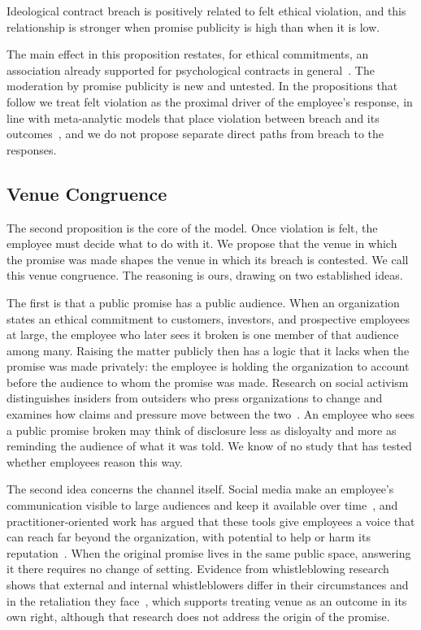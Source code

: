 \begin{proposition}
Ideological contract breach is positively related to felt ethical violation, and this relationship is stronger when promise publicity is high than when it is low.
\end{proposition}

The main effect in this proposition restates, for ethical commitments, an association already supported for psychological contracts in general~\citep{zhao2007impact}. The moderation by promise publicity is new and untested. In the propositions that follow we treat felt violation as the proximal driver of the employee's response, in line with meta-analytic models that place violation between breach and its outcomes~\citep{zhao2007impact}, and we do not propose separate direct paths from breach to the responses.

\subsection{Venue Congruence}

The second proposition is the core of the model. Once violation is felt, the employee must decide what to do with it. We propose that the venue in which the promise was made shapes the venue in which its breach is contested. We call this venue congruence. The reasoning is ours, drawing on two established ideas.

The first is that a public promise has a public audience. When an organization states an ethical commitment to customers, investors, and prospective employees at large, the employee who later sees it broken is one member of that audience among many. Raising the matter publicly then has a logic that it lacks when the promise was made privately: the employee is holding the organization to account before the audience to whom the promise was made. Research on social activism distinguishes insiders from outsiders who press organizations to change and examines how claims and pressure move between the two~\citep{briscoe2016social}. An employee who sees a public promise broken may think of disclosure less as disloyalty and more as reminding the audience of what it was told. We know of no study that has tested whether employees reason this way.

The second idea concerns the channel itself. Social media make an employee's communication visible to large audiences and keep it available over time~\citep{treem2013social}, and practitioner-oriented work has argued that these tools give employees a voice that can reach far beyond the organization, with potential to help or harm its reputation~\citep{miles2014employee}. When the original promise lives in the same public space, answering it there requires no change of setting. Evidence from whistleblowing research shows that external and internal whistleblowers differ in their circumstances and in the retaliation they face~\citep{dworkin1998internal}, which supports treating venue as an outcome in its own right, although that research does not address the origin of the promise.

